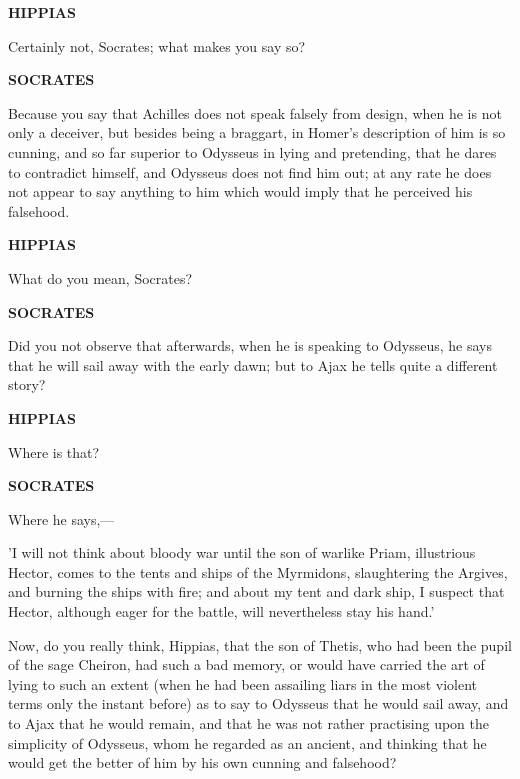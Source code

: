 \documentclass[11pt,letter]{article}
\begin{document}
\par \textbf{HIPPIAS}
\par   Certainly not, Socrates; what makes you say so?

\par \textbf{SOCRATES}
\par   Because you say that Achilles does not speak falsely from design, when he is not only a deceiver, but besides being a braggart, in Homer's description of him is so cunning, and so far superior to Odysseus in lying and pretending, that he dares to contradict himself, and Odysseus does not find him out; at any rate he does not appear to say anything to him which would imply that he perceived his falsehood.

\par \textbf{HIPPIAS}
\par   What do you mean, Socrates?

\par \textbf{SOCRATES}
\par   Did you not observe that afterwards, when he is speaking to Odysseus, he says that he will sail away with the early dawn; but to Ajax he tells quite a different story?

\par \textbf{HIPPIAS}
\par   Where is that?

\par \textbf{SOCRATES}
\par   Where he says,—

\par  'I will not think about bloody war until the son of warlike Priam, illustrious Hector, comes to the tents and ships of the Myrmidons, slaughtering the Argives, and burning the ships with fire; and about my tent and dark ship, I suspect that Hector, although eager for the battle, will nevertheless stay his hand.'

\par  Now, do you really think, Hippias, that the son of Thetis, who had been the pupil of the sage Cheiron, had such a bad memory, or would have carried the art of lying to such an extent (when he had been assailing liars in the most violent terms only the instant before) as to say to Odysseus that he would sail away, and to Ajax that he would remain, and that he was not rather practising upon the simplicity of Odysseus, whom he regarded as an ancient, and thinking that he would get the better of him by his own cunning and falsehood?
\end{document}
